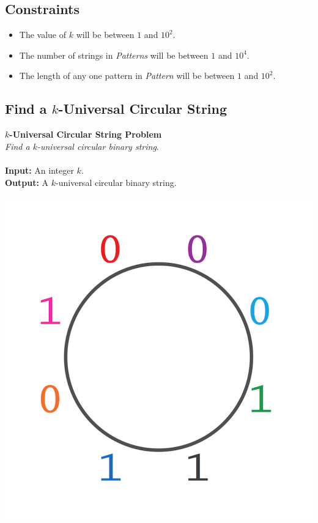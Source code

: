 \documentclass{article}
\begin{document}
\subsection*{Constraints}
\begin{itemize}
    \item The value of $k$ will be between $1$ and $10^2$.
    \item The number of strings in \emph{Patterns} will be between $1$ and $10^4$.
    \item The length of any one pattern in \emph{Pattern} will be between $1$ and $10^2$.
\end{itemize}
\pagebreak

\subsection{Find a $k$-Universal Circular String}
\hline\vspace{5}
\textbf{$k$-Universal Circular String Problem}\\
\emph{Find a $k$-universal circular binary string}.\\ \\
\textbf{Input:} An integer $k$.\\
\textbf{Output:} A $k$-universal circular binary string.
\begin{center}
    \includegraphics[scale=0.16]{c3/logos/3I.png}
\end{center}
\hline\vspace{5}
\end{document}
